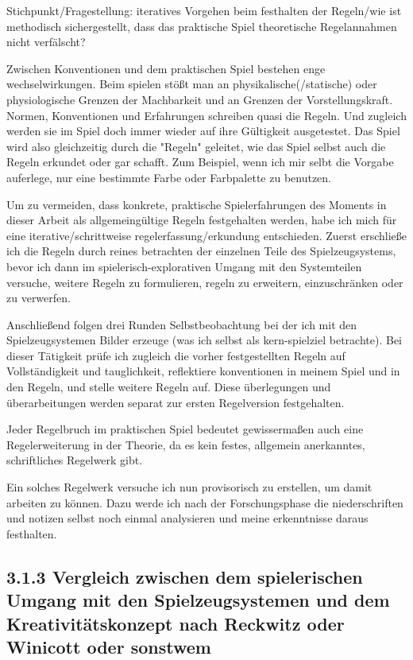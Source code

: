 \documentclass[11pt,a4paper,twoside]{scrreprt}
\begin{document}
Stichpunkt/Fragestellung: iteratives Vorgehen beim festhalten der Regeln/wie ist methodisch sichergestellt, dass das praktische Spiel theoretische Regelannahmen nicht verfälscht?

Zwischen Konventionen und dem praktischen Spiel bestehen enge wechselwirkungen. Beim spielen stößt man an physikalische(/statische) oder physiologische Grenzen der Machbarkeit und an Grenzen der Vorstellungskraft. Normen, Konventionen und Erfahrungen schreiben quasi die Regeln. Und zugleich werden sie im Spiel doch immer wieder auf ihre Gültigkeit ausgetestet. Das Spiel wird also gleichzeitig durch die "Regeln" geleitet, wie das Spiel selbst auch die Regeln erkundet oder gar schafft. Zum Beispiel, wenn ich mir selbt die Vorgabe auferlege, nur eine bestimmte Farbe oder Farbpalette zu benutzen.

Um zu vermeiden, dass konkrete, praktische Spielerfahrungen des Moments in dieser Arbeit als allgemeingültige Regeln festgehalten werden, habe ich mich für eine iterative/schrittweise regelerfassung/erkundung entschieden. 
Zuerst erschließe ich die Regeln durch reines betrachten der einzelnen Teile des Spielzeugsystems, bevor ich dann im spielerisch-explorativen Umgang mit den Systemteilen versuche, weitere Regeln zu formulieren, regeln zu erweitern, einzuschränken oder zu verwerfen. 

Anschließend folgen drei Runden Selbstbeobachtung bei der ich mit den Spielzeugsystemen Bilder erzeuge (was ich selbst als kern-spielziel betrachte). Bei dieser Tätigkeit prüfe ich zugleich die vorher festgestellten Regeln auf Vollständigkeit und tauglichkeit, reflektiere konventionen in meinem Spiel und in den Regeln, und stelle weitere Regeln auf. Diese überlegungen und überarbeitungen werden separat zur ersten Regelversion festgehalten.

Jeder Regelbruch im praktischen Spiel bedeutet gewissermaßen auch eine Regelerweiterung in der Theorie, da es kein festes, allgemein anerkanntes, schriftliches Regelwerk gibt.

Ein solches Regelwerk versuche ich nun provisorisch zu erstellen, um damit arbeiten zu können.
Dazu werde ich nach der Forschungsphase die niederschriften und notizen selbst noch einmal analysieren und meine erkenntnisse daraus festhalten.

		\subsection{3.1.3 Vergleich zwischen dem spielerischen Umgang mit den Spielzeugsystemen und dem Kreativitätskonzept nach Reckwitz oder Winicott oder sonstwem}
\end{document}
